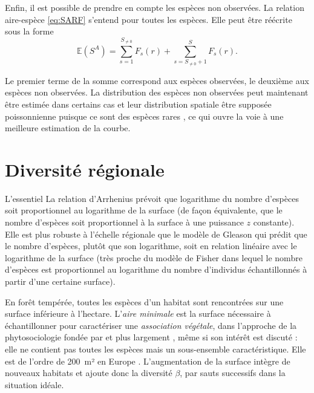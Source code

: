 \documentclass[
  11pt,
  french,
  a4paper,
  extrafontsizes,onecolumn,openright
  ]{memoir}
\newenvironment{Summary}
  {\begin{bclogo}[logo=\bctrombone, noborder=true, couleur=lightgray!50]{L'essentiel}\parindent0pt}
  {\end{bclogo}}
\newlength{\rf}
\begin{document}
Enfin, il est possible de prendre en compte les espèces non observées.
La relation aire-espèce \eqref{eq:SARF} s'entend pour toutes les espèces.
Elle peut être réécrite sous la forme
\begin{equation}
  \label{eq:SARF2}
  {\mathbb E}\left( S^A \right) 
  = \sum_{s=1}^{S_{\ne 0}}{F_s\left( r \right)}
    + \sum_{s=S_{\ne 0}+1}^{S}{F_s\left( r \right)}.
\end{equation}

Le premier terme de la somme correspond aux espèces observées, le deuxième aux espèces non observées.
La distribution des espèces non observées peut maintenant être estimée dans certains cas \autocite{Chao2014c} et leur distribution spatiale être supposée poissonnienne puisque ce sont des espèces rares \autocite{Picard2004}, ce qui ouvre la voie à une meilleure estimation de la courbe.

\chapter{Diversité régionale}\label{diversituxe9-ruxe9gionale}

\begin{Summary}
La relation d'Arrhenius prévoit que logarithme du nombre d'espèces soit proportionnel au logarithme de la surface (de façon équivalente, que le nombre d'espèces soit proportionnel à la surface à une puissance \(z\) constante).
Elle est plus robuste à l'échelle régionale que le modèle de Gleason qui prédit que le nombre d'espèces, plutôt que son logarithme, soit en relation linéaire avec le logarithme de la surface (très proche du modèle de Fisher dans lequel le nombre d'espèces est proportionnel au logarithme du nombre d'individus échantillonnés à partir d'une certaine surface).

\end{Summary}

En forêt tempérée, toutes les espèces d'un habitat sont rencontrées sur une surface inférieure à l'hectare.
L'\emph{aire minimale} est la surface nécessaire à échantillonner pour caractériser une \emph{association végétale}, dans l'approche de la phytosociologie fondée par \textcite{Braun-Blanquet1928} et plus largement \autocite{Greig-Smith1983}, même si son intérêt est discuté \autocite{McGuinness1984}: elle ne contient pas toutes les espèces mais un sous-ensemble caractéristique.
Elle est de l'ordre de 200~m² en Europe \autocite{Chytry2003}.
L'augmentation de la surface intègre de nouveaux habitats et ajoute donc la diversité \(\beta\), par sauts successifs dans la situation idéale.
\end{document}
